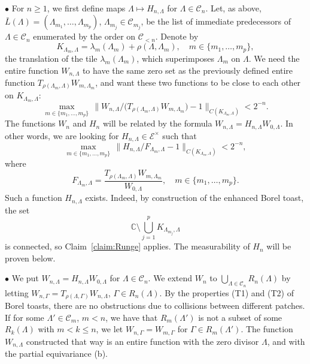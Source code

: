 \documentclass[11pt]{paper}
\newcommand{\bC}{\mathbb C}
\newcommand{\cE}{\mathcal E}
\newcommand{\cC}{\mathcal C}
\begin{document}
\medskip

\noindent $\bullet$\;\; For $n\ge 1$, we first define maps $\Lambda\mapsto H_{n,\Lambda}$ for
$\Lambda\in\cC_n$.
Let, as above, $\bar L(\Lambda)=(\Lambda_{m_1}, \ldots , \Lambda_{m_p})$,
$\Lambda_{m_j}\in \cC_{m_j}$, be the list of immediate predecessors of $\Lambda\in\cC_n$
enumerated by the order on $\cC_{<n}$.
Denote by
\[
K_{\Lambda_m ,\Lambda} = \lambda_m(\Lambda_m) + \rho(\Lambda, \Lambda_m),
\quad  m\in \{m_1, \ldots , m_p\},
\]
the translation of the tile $\lambda_m(\Lambda_m)$, which superimposes
$\Lambda_m$ on $\Lambda$. We need the entire function $W_{n,\Lambda}$ to have
the same zero set as the previously defined entire function
$T_{\rho(\Lambda_m, \Lambda)}W_{m, \Lambda_m}$, and want these two functions to be
close to each other on $K_{\Lambda_m, \Lambda}$:
\begin{equation}\label{eq:quotient-bd}
\max_{m\in \{m_1, \ldots , m_p\}} \,
\big\lVert W_{n,\Lambda}/\bigl( T_{\rho(\Lambda_m, \Lambda)}W_{m,\Lambda_m} \bigr)
-1\big\rVert_{C(K_{\Lambda_m, \Lambda})} < 2^{-n}.
\end{equation}
The functions \(W_{n}\) and \(H_{n}\) will be related by the formula \(W_{n, \Lambda} = H_{n,
  \Lambda} W_{0, \Lambda}\).  In other words,  we are looking for $H_{n, \Lambda}\in\cE^\times$ such that
\begin{equation}\label{eq:quotient-bd-1}
\max_{m\in \{m_1, \ldots , m_p\}} \,
\big\lVert H_{n, \Lambda}/F_{\Lambda_m, \Lambda}
- 1 \big\rVert_{C(K_{\Lambda_m, \Lambda})} < 2^{-n},
\end{equation}
where
\begin{equation}\label{eq:prev-Fj}
F_{\Lambda_m, \Lambda} =
\frac{T_{\rho(\Lambda_m, \Lambda)}W_{m,\Lambda_m}}{W_{0,\Lambda}},
\quad m\in \{m_1, \ldots , m_p\}.
\end{equation}
Such a function $H_{n,\Lambda}$ exists.
Indeed, by construction of the enhanced Borel toast, the set
\[
\bC\setminus\bigcup_{j=1}^p K_{\Lambda_{m_{j}}, \Lambda}
\]
is connected, so Claim~\ref{claim:Runge} applies.
The measurability of $H_n$ will be proven below.

\medskip

\noindent $\bullet$\;\; We put $W_{n,\Lambda}=H_{n,\Lambda}W_{0,\Lambda}$ for
$\Lambda\in\cC_n$.
We extend $W_n$ to $\bigcup_{\Lambda\in\cC_n}R_n(\Lambda)$
by letting $W_{n,\Gamma}=T_{\rho(\Lambda, \Gamma)}W_{n,\Lambda}$,
$\Gamma\in R_n(\Lambda)$.
By the properties (T1) and (T2) of Borel toasts, there
are no obstructions due to collisions between different patches.
If for some $\Lambda'\in\cC_m$, $m<n$, we have that $R_{m}(\Lambda')$
is not a subset of some $R_k(\Lambda)$ with
$m<k\le n$, we let $W_{n, \Gamma}=W_{m, \Gamma}$ for $\Gamma\in R_{m}(\Lambda')$.
The function $W_{n,\Lambda}$ constructed that way is an entire
function with the zero divisor $\Lambda$, and with the partial equivariance (b).
\end{document}

